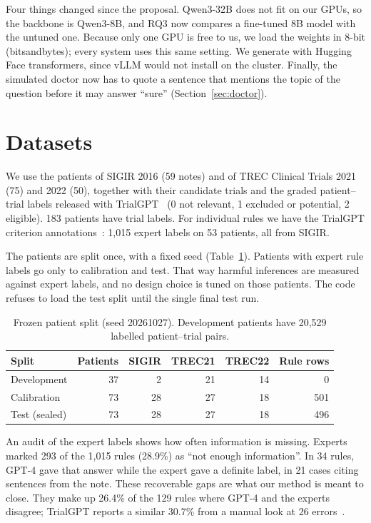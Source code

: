 \documentclass[10pt,a4paper,twocolumn]{article}
\begin{document}
Four things changed since the proposal. Qwen3-32B does not fit on our GPUs, so the backbone is Qwen3-8B, and RQ3 now compares a fine-tuned 8B model with the untuned one. Because only one GPU is free to us, we load the weights in 8-bit (bitsandbytes); every system uses this same setting. We generate with Hugging Face transformers, since vLLM would not install on the cluster. Finally, the simulated doctor now has to quote a sentence that mentions the topic of the question before it may answer ``sure'' (Section~\ref{sec:doctor}).

\section{Datasets}
We use the patients of SIGIR 2016 (59 notes) and of TREC Clinical Trials 2021 (75) and 2022 (50), together with their candidate trials and the graded patient--trial labels released with TrialGPT~\cite{trialgpt} (0 not relevant, 1 excluded or potential, 2 eligible). 183 patients have trial labels. For individual rules we have the TrialGPT criterion annotations~\cite{trialgptann}: 1{,}015 expert labels on 53 patients, all from SIGIR.

The patients are split once, with a fixed seed (Table~\ref{tab:split}). Patients with expert rule labels go only to calibration and test. That way harmful inferences are measured against expert labels, and no design choice is tuned on those patients. The code refuses to load the test split until the single final test run.

\begin{table}[H]
\centering\footnotesize
\begin{tabular}{@{}lrrrrr@{}}
\toprule
\textbf{Split} & \textbf{Patients} & \textbf{SIGIR} & \textbf{TREC21} & \textbf{TREC22} & \textbf{Rule rows}\\
\midrule
Development & 37 & 2 & 21 & 14 & 0\\
Calibration & 73 & 28 & 27 & 18 & 501\\
Test (sealed) & 73 & 28 & 27 & 18 & 496\\
\bottomrule
\end{tabular}
\caption{Frozen patient split (seed 20261027). Development patients have 20{,}529 labelled patient--trial pairs.}
\label{tab:split}
\end{table}

An audit of the expert labels shows how often information is missing. Experts marked 293 of the 1{,}015 rules (28.9\%) as ``not enough information''. In 34 rules, GPT-4 gave that answer while the expert gave a definite label, in 21 cases citing sentences from the note. These recoverable gaps are what our method is meant to close. They make up 26.4\% of the 129 rules where GPT-4 and the experts disagree; TrialGPT reports a similar 30.7\% from a manual look at 26 errors~\cite{trialgpt}.
\end{document}
